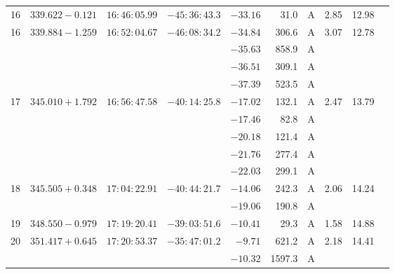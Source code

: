 {\begin{longtable}{l lll r r c rrr}
16   &  $339.622-0.121$   &  $16:46:05.99$    & $-45:36:43.3$    & $ -33.16 $ &    31.0&       A    &    2.85  &   12.98   &           \\
16   &  $339.884-1.259$   &  $16:52:04.67$    & $-46:08:34.2$    & $ -34.84 $ &   306.6&       A    &    3.07  &   12.78   &           \\
     &  $             $   &  $           $    & $           $    & $ -35.63 $ &   858.9&       A    &          &           &           \\
     &  $             $   &  $           $    & $           $    & $ -36.51 $ &   309.1&       A    &          &           &           \\
     &  $             $   &  $           $    & $           $    & $ -37.39 $ &   523.5&       A    &          &           &           \\
17   &  $345.010+1.792$   &  $16:56:47.58$    & $-40:14:25.8$    & $ -17.02 $ &   132.1&       A    &    2.47  &   13.79   &           \\
     &  $             $   &  $           $    & $           $    & $ -17.46 $ &    82.8&       A    &          &           &           \\
     &  $             $   &  $           $    & $           $    & $ -20.18 $ &   121.4&       A    &          &           &           \\
     &  $             $   &  $           $    & $           $    & $ -21.76 $ &   277.4&       A    &          &           &           \\
     &  $             $   &  $           $    & $           $    & $ -22.03 $ &   299.1&       A    &          &           &           \\
18   &  $345.505+0.348$   &  $17:04:22.91$    & $-40:44:21.7$    & $ -14.06 $ &   242.3&       A    &    2.06  &   14.24   &           \\
     &  $             $   &  $           $    & $           $    & $ -19.06 $ &   190.8&       A    &          &           &           \\
19   &  $348.550-0.979$   &  $17:19:20.41$    & $-39:03:51.6$    & $ -10.41 $ &    29.3&       A    &    1.58  &   14.88   &           \\
20   &  $351.417+0.645$   &  $17:20:53.37$    & $-35:47:01.2$    & $  -9.71 $ &   621.2&       A    &    2.18  &   14.41   &           \\
     &  $             $   &  $           $    & $           $    & $ -10.32 $ &  1597.3&       A    &          &           &           \\

\end{longtable}}
